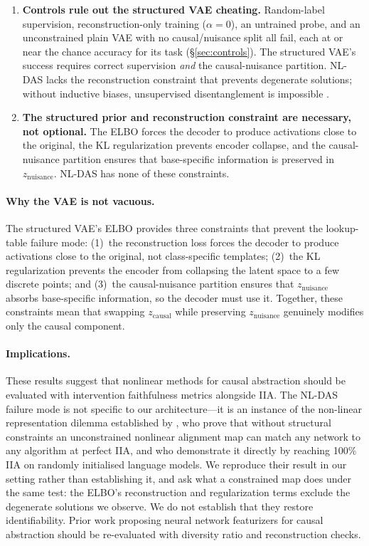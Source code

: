 \documentclass{article}
\begin{document}
\begin{enumerate}[leftmargin=*]
\item \textbf{Controls rule out the structured VAE cheating.} Random-label
  supervision, reconstruction-only training ($\alpha = 0$), an untrained probe,
  and an unconstrained plain VAE with no causal/nuisance split all fail, each at
  or near the chance accuracy for its task (\S\ref{sec:controls}). The structured
  VAE's success requires correct supervision \emph{and} the
  causal-nuisance partition. NL-DAS lacks the reconstruction constraint
  that prevents degenerate solutions; without inductive biases, unsupervised
  disentanglement is impossible \citep{locatello2019challenging}.

\item \textbf{The structured prior and reconstruction constraint are
  necessary, not optional.} The ELBO forces the decoder to produce
  activations close to the original, the KL regularization prevents
  encoder collapse, and the causal-nuisance partition ensures that
  base-specific information is preserved in $z_\text{nuisance}$.
  NL-DAS has none of these constraints.
\end{enumerate}

\paragraph{Why the VAE is not vacuous.}
The structured VAE's ELBO provides three constraints that prevent the
lookup-table failure mode: (1)~the reconstruction loss forces the decoder to
produce activations close to the original, not class-specific templates;
(2)~the KL regularization prevents the encoder from collapsing the latent space
to a few discrete points; and (3)~the causal-nuisance partition ensures that
$z_\text{nuisance}$ absorbs base-specific information, so the decoder must use
it. Together, these constraints mean that swapping $z_\text{causal}$ while
preserving $z_\text{nuisance}$ genuinely modifies only the causal component.

\paragraph{Implications.}
These results suggest that nonlinear methods for causal abstraction should be
evaluated with intervention faithfulness metrics alongside IIA. The NL-DAS failure mode is not specific to
our architecture---it is an instance of the non-linear representation dilemma
established by \citet{sutter2025nonlinear}, who prove that without structural
constraints an unconstrained nonlinear alignment map can match any network to any
algorithm at perfect IIA, and who demonstrate it directly by reaching 100\% IIA
on randomly initialised language models. We reproduce their result in our setting
rather than establishing it, and ask what a constrained map does under the same
test: the ELBO's
reconstruction and regularization terms exclude the degenerate solutions we
observe. We do not establish that they restore identifiability.
Prior work proposing neural network featurizers for causal abstraction
\citep{geiger2024causal} should be re-evaluated with diversity ratio and
reconstruction checks.
\end{document}
